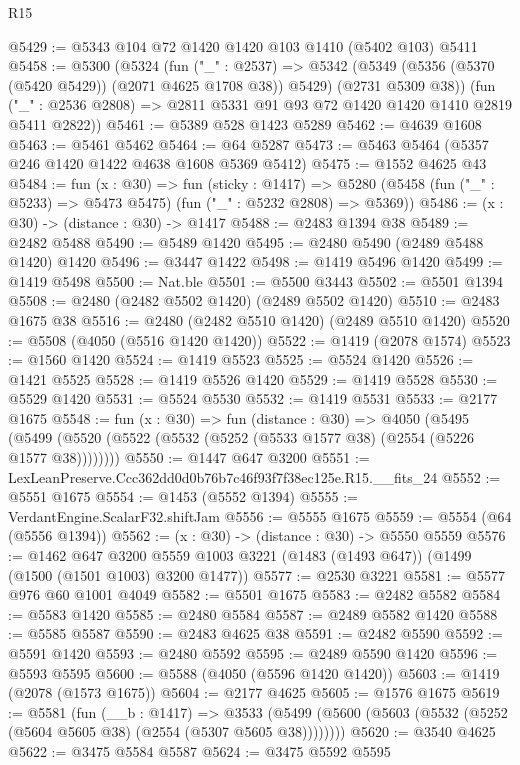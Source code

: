 \begin{lexlean}{R15}
\begin{coremodule}
@5429 := @5343 @104 @72 @1420 @1420 @103 @1410 (@5402 @103) @5411
@5458 := @5300
    (@5324
      (fun ("_" : @2537) =>
      @5342 (@5349 (@5356 (@5370 (@5420 @5429)) (@2071 @4625 @1708 @38)) @5429) (@2731 @5309 @38))
      (fun ("_" : @2536 @2808) => @2811 @5331 @91 @93 @72 @1420 @1420 @1410 @2819 @5411 @2822))
@5461 := @5389 @528 @1423 @5289
@5462 := @4639 @1608
@5463 := @5461 @5462
@5464 := @64 @5287
@5473 := @5463 @5464 (@5357 @246 @1420 @1422 @4638 @1608 @5369 @5412)
@5475 := @1552 @4625 @43
@5484 := fun (x : @30) =>
  fun (sticky : @1417) =>
  @5280 (@5458 (fun ("_" : @5233) => @5473 @5475) (fun ("_" : @5232 @2808) => @5369))
@5486 := (x : @30) -> (distance : @30) -> @1417
@5488 := @2483 @1394 @38
@5489 := @2482 @5488
@5490 := @5489 @1420
@5495 := @2480 @5490 (@2489 @5488 @1420) @1420
@5496 := @3447 @1422
@5498 := @1419 @5496 @1420
@5499 := @1419 @5498
@5500 := Nat.ble
@5501 := @5500 @3443
@5502 := @5501 @1394
@5508 := @2480 (@2482 @5502 @1420) (@2489 @5502 @1420)
@5510 := @2483 @1675 @38
@5516 := @2480 (@2482 @5510 @1420) (@2489 @5510 @1420)
@5520 := @5508 (@4050 (@5516 @1420 @1420))
@5522 := @1419 (@2078 @1574)
@5523 := @1560 @1420
@5524 := @1419 @5523
@5525 := @5524 @1420
@5526 := @1421 @5525
@5528 := @1419 @5526 @1420
@5529 := @1419 @5528
@5530 := @5529 @1420
@5531 := @5524 @5530
@5532 := @1419 @5531
@5533 := @2177 @1675
@5548 := fun (x : @30) =>
  fun (distance : @30) =>
  @4050 (@5495 (@5499 (@5520 (@5522 (@5532 (@5252 (@5533 @1577 @38) (@2554 (@5226 @1577 @38))))))))
@5550 := @1447 @647 @3200
@5551 := LexLeanPreserve.Ccc362dd0d0b76b7c46f93f7f38ec125e.R15.__fits_24
@5552 := @5551 @1675
@5554 := @1453 (@5552 @1394)
@5555 := VerdantEngine.ScalarF32.shiftJam
@5556 := @5555 @1675
@5559 := @5554 (@64 (@5556 @1394))
@5562 := (x : @30) -> (distance : @30) -> @5550 @5559
@5576 := @1462
    @647
    @3200
    @5559
    @1003
    @3221
    (@1483 (@1493 @647))
    (@1499 (@1500 (@1501 @1003) @3200 @1477))
@5577 := @2530 @3221
@5581 := @5577 @976 @60 @1001 @4049
@5582 := @5501 @1675
@5583 := @2482 @5582
@5584 := @5583 @1420
@5585 := @2480 @5584
@5587 := @2489 @5582 @1420
@5588 := @5585 @5587
@5590 := @2483 @4625 @38
@5591 := @2482 @5590
@5592 := @5591 @1420
@5593 := @2480 @5592
@5595 := @2489 @5590 @1420
@5596 := @5593 @5595
@5600 := @5588 (@4050 (@5596 @1420 @1420))
@5603 := @1419 (@2078 (@1573 @1675))
@5604 := @2177 @4625
@5605 := @1576 @1675
@5619 := @5581
    (fun (__b : @1417) =>
    @3533 (@5499 (@5600 (@5603 (@5532 (@5252 (@5604 @5605 @38) (@2554 (@5307 @5605 @38))))))))
@5620 := @3540 @4625
@5622 := @3475 @5584 @5587
@5624 := @3475 @5592 @5595

\end{coremodule}
\end{lexlean}
